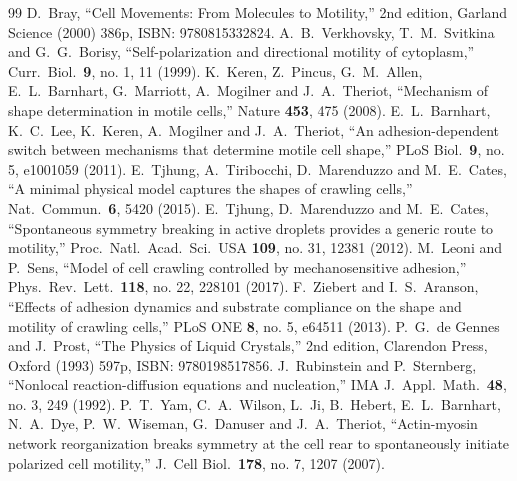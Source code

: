 \documentclass[11pt]{article}
\begin{document}
\begin{thebibliography}{99}
  D.~Bray,
  ``Cell Movements: From Molecules to Motility,'' 2nd edition,
  Garland Science (2000) 386p,
  ISBN: 9780815332824.
  A.~B.~Verkhovsky, T.~M.~Svitkina and G.~G.~Borisy,
  ``Self-polarization and directional motility of cytoplasm,''
  Curr.\ Biol.\  {\bf 9}, no. 1, 11 (1999).
  K.~Keren, Z.~Pincus, G.~M.~Allen, E.~L.~Barnhart, G.~Marriott,
  A.~Mogilner and J.~A.~Theriot,
  ``Mechanism of shape determination in motile cells,''
  Nature {\bf 453}, 475 (2008).
  E.~L.~Barnhart, K.~C.~Lee, K.~Keren, A.~Mogilner and J.~A.~Theriot,
  ``An adhesion-dependent switch between mechanisms that determine motile cell
  shape,''
  PLoS Biol.\  {\bf 9}, no. 5, e1001059 (2011).
  E.~Tjhung, A.~Tiribocchi, D.~Marenduzzo and M.~E.~Cates,
  ``A minimal physical model captures the shapes of crawling cells,''
  Nat.\ Commun.\  {\bf 6}, 5420 (2015).
  E.~Tjhung, D.~Marenduzzo and M.~E.~Cates,
  ``Spontaneous symmetry breaking in active droplets provides a generic route to
  motility,''
  Proc.\ Natl.\ Acad.\ Sci.\ USA {\bf 109}, no. 31, 12381 (2012).
  M.~Leoni and P.~Sens,
  ``Model of cell crawling controlled by mechanosensitive adhesion,''
  Phys.\ Rev.\ Lett.\  {\bf 118}, no. 22, 228101 (2017).
  F.~Ziebert and I.~S.~Aranson,
  ``Effects of adhesion dynamics and substrate compliance on the shape and
  motility of crawling cells,''
  PLoS ONE {\bf 8}, no. 5, e64511 (2013).
  P.~G.~de Gennes and J.~Prost,
  ``The Physics of Liquid Crystals,'' 2nd edition,
  Clarendon Press, Oxford (1993) 597p,
  ISBN: 9780198517856.
  J.~Rubinstein and P.~Sternberg,
  ``Nonlocal reaction-diffusion equations and nucleation,''
  IMA J.\ Appl.\ Math.\  {\bf 48}, no. 3, 249 (1992).
  P.~T.~Yam, C.~A.~Wilson, L.~Ji, B.~Hebert, E.~L.~Barnhart, N.~A.~Dye,
  P.~W.~Wiseman, G.~Danuser and J.~A.~Theriot,
  ``Actin-myosin network reorganization breaks symmetry at the cell rear to
  spontaneously initiate polarized cell motility,''
  J.\ Cell Biol.\  {\bf 178}, no. 7, 1207 (2007).
\end{thebibliography}
\end{document}
